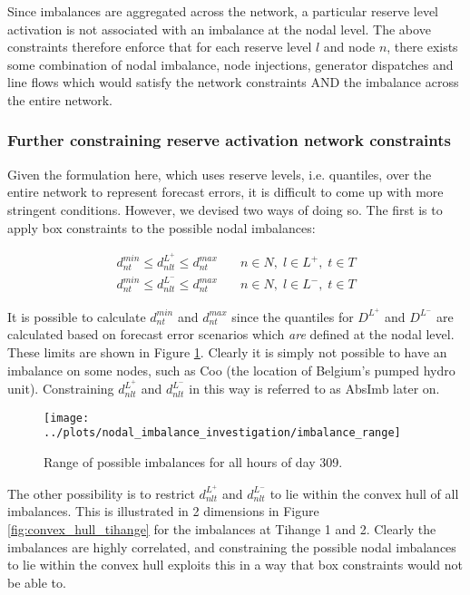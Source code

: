 \documentclass[number,times]{elsarticle}
\begin{document}
Since imbalances are aggregated across the network, a particular reserve level activation is not associated with an imbalance at the nodal level. The above constraints therefore enforce that for each reserve level $l$ and node $n$, there exists some combination of nodal imbalance, node injections, generator dispatches and line flows which would satisfy the network constraints AND the imbalance across the entire network.

\subsubsection{Further constraining reserve activation network constraints} \label{sec:further_constraining_operating_reserve_network_activation_constraints}

Given the formulation here, which uses reserve levels, i.e. quantiles, over the entire network to represent forecast errors, it is difficult to come up with more stringent conditions. However, we devised two ways of doing so. The first is to apply box constraints to the possible nodal imbalances:

\begin{align}
    d_{nt}^{min} \leq d_{nlt}^{L^+} \leq d_{nt}^{max} & \quad n \in N, \; l \in L^+, \; t \in T \\
    d_{nt}^{min} \leq d_{nlt}^{L^-} \leq d_{nt}^{max} & \quad n \in N, \; l \in L^-, \; t \in T
\end{align}

It is possible to calculate $d_{nt}^{min}$ and $d_{nt}^{max}$ since the quantiles for $D^{L^+}$ and $D^{L^-}$ are calculated based on forecast error scenarios which \emph{are} defined at the nodal level. These limits are shown in Figure \ref{fig:imbalance_range}. Clearly it is simply not possible to have an imbalance on some nodes, such as Coo (the location of Belgium's pumped hydro unit). Constraining $d_{nlt}^{L^+}$ and $d_{nlt}^{L^-}$ in this way is referred to as AbsImb later on.

\begin{figure}[ht]
    \centering
    \texttt{[image: ../plots/nodal\_imbalance\_investigation/imbalance\_range]}
    \caption{Range of possible imbalances for all hours of day 309.\label{fig:imbalance_range}}
\end{figure}

The other possibility is to restrict $d_{nlt}^{L^+}$ and $d_{nlt}^{L^-}$ to lie within the convex hull of all imbalances. This is illustrated in 2 dimensions in Figure \ref{fig:convex_hull_tihange} for the imbalances at Tihange 1 and 2. Clearly the imbalances are highly correlated, and constraining the possible nodal imbalances to lie within the convex hull exploits this in a way that box constraints would not be able to.
\end{document}
